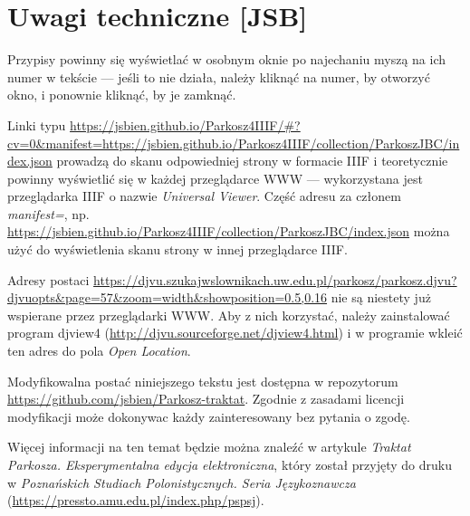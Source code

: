 \documentclass[dvipsnames,12pt]{report}
\begin{document}
\section*{Uwagi techniczne [JSB]}
\label{sec:Uwagi techniczne}

{

Przypisy powinny się wyświetlać w osobnym oknie po najechaniu myszą na
ich numer w tekście --- jeśli to nie działa, należy kliknąć na
numer, by otworzyć okno, i ponownie kliknąć, by je zamknąć.

\break Linki typu
\url{https://jsbien.github.io/Parkosz4IIIF/\#?cv=0&manifest=https://jsbien.github.io/Parkosz4IIIF/collection/ParkoszJBC/index.json}
prowadzą do skanu odpowiedniej strony w formacie IIIF i teoretycznie
powinny wyświetlić się w każdej przeglądarce WWW --- wykorzystana jest
przeglądarka IIIF o nazwie \textit{Universal Viewer}. Część adresu
za członem \textit{manifest=}, np.
\url{https://jsbien.github.io/Parkosz4IIIF/collection/ParkoszJBC/index.json}
można użyć do wyświetlenia skanu strony w innej przeglądarce IIIF.

Adresy postaci
\url{https://djvu.szukajwslownikach.uw.edu.pl/parkosz/parkosz.djvu?djvuopts&page=57&zoom=width&showposition=0.5,0.16}
nie są niestety już wspierane przez przeglądarki WWW. Aby z nich
korzystać, należy zainstalować program \textsf{djview4}
(\url{http://djvu.sourceforge.net/djview4.html}) i w programie wkleić
  ten adres do pola \textit{Open Location}.

  Modyfikowalna postać niniejszego tekstu jest dostępna w
  repozytorum
  \url{https://github.com/jsbien/Parkosz-traktat}. Zgodnie z zasadami
  licencji modyfikacji może dokonywac każdy zainteresowany bez pytania
  o zgodę.

  Więcej informacji na ten temat będzie można znaleźć w artykule
  \textit{Traktat Parkosza. Eksperymentalna edycja elektroniczna},
  który został przyjęty do druku w \textit{Poznańskich Studiach
    Polonistycznych. Seria Językoznawcza}
  (\url{https://pressto.amu.edu.pl/index.php/pspsj}).
}  
\newpage
{}
{}
{}
 
 \newpage
{}
\end{document}
